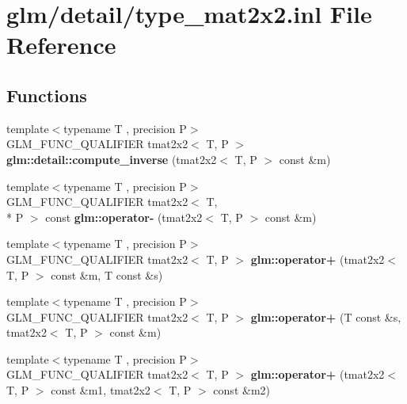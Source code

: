 \hypertarget{type__mat2x2_8inl}{\section{glm/detail/type\-\_\-mat2x2.inl File Reference}
\label{type__mat2x2_8inl}
}
\subsection*{Functions}
\begin{DoxyCompactItemize}
\item 
\hypertarget{namespaceglm_1_1detail_a214532e9ff939e1ceeffb00ceb387e9d}{{\footnotesize template$<$typename T , precision P$>$ }\\G\-L\-M\-\_\-\-F\-U\-N\-C\-\_\-\-Q\-U\-A\-L\-I\-F\-I\-E\-R tmat2x2$<$ T, P $>$ {\bfseries glm\-::detail\-::compute\-\_\-inverse} (tmat2x2$<$ T, P $>$ const \&m)}\label{namespaceglm_1_1detail_a214532e9ff939e1ceeffb00ceb387e9d}

\item 
\hypertarget{namespaceglm_afc66c008afc62f2f812446752187fc4d}{{\footnotesize template$<$typename T , precision P$>$ }\\G\-L\-M\-\_\-\-F\-U\-N\-C\-\_\-\-Q\-U\-A\-L\-I\-F\-I\-E\-R tmat2x2$<$ T, \\*
P $>$ const {\bfseries glm\-::operator-\/} (tmat2x2$<$ T, P $>$ const \&m)}\label{namespaceglm_afc66c008afc62f2f812446752187fc4d}

\item 
\hypertarget{namespaceglm_af95592c53ae62512b260ff07e16731ee}{{\footnotesize template$<$typename T , precision P$>$ }\\G\-L\-M\-\_\-\-F\-U\-N\-C\-\_\-\-Q\-U\-A\-L\-I\-F\-I\-E\-R tmat2x2$<$ T, P $>$ {\bfseries glm\-::operator+} (tmat2x2$<$ T, P $>$ const \&m, T const \&s)}\label{namespaceglm_af95592c53ae62512b260ff07e16731ee}

\item 
\hypertarget{namespaceglm_aa70e85814d7889ed2c79dc4353068771}{{\footnotesize template$<$typename T , precision P$>$ }\\G\-L\-M\-\_\-\-F\-U\-N\-C\-\_\-\-Q\-U\-A\-L\-I\-F\-I\-E\-R tmat2x2$<$ T, P $>$ {\bfseries glm\-::operator+} (T const \&s, tmat2x2$<$ T, P $>$ const \&m)}\label{namespaceglm_aa70e85814d7889ed2c79dc4353068771}

\item 
\hypertarget{namespaceglm_aaba2f45dbfefdf70d0434dc7e1f5e664}{{\footnotesize template$<$typename T , precision P$>$ }\\G\-L\-M\-\_\-\-F\-U\-N\-C\-\_\-\-Q\-U\-A\-L\-I\-F\-I\-E\-R tmat2x2$<$ T, P $>$ {\bfseries glm\-::operator+} (tmat2x2$<$ T, P $>$ const \&m1, tmat2x2$<$ T, P $>$ const \&m2)}\label{namespaceglm_aaba2f45dbfefdf70d0434dc7e1f5e664}


\end{DoxyCompactItemize}
